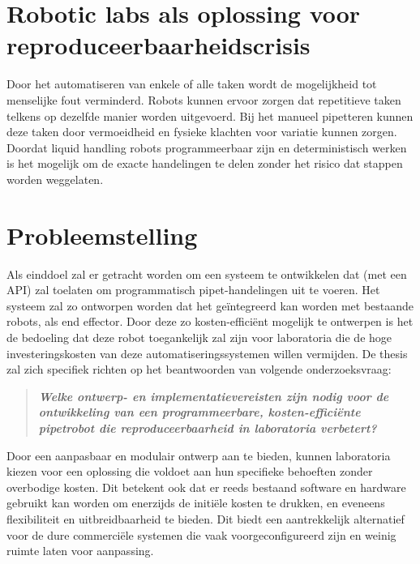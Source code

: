 \section{Robotic labs als oplossing voor reproduceerbaarheidscrisis}
Door het automatiseren van enkele of alle taken wordt de mogelijkheid tot menselijke fout verminderd. Robots kunnen ervoor zorgen dat repetitieve taken telkens op dezelfde manier worden uitgevoerd. Bij het manueel pipetteren kunnen deze taken door vermoeidheid en fysieke klachten voor variatie kunnen zorgen.\ \cite{RN9} Doordat liquid handling robots programmeerbaar zijn en deterministisch werken is het mogelijk om de exacte handelingen te delen zonder het risico dat stappen worden weggelaten.

\section{Probleemstelling}
Als einddoel zal er getracht worden om een systeem te ontwikkelen dat (met een API) zal toelaten om programmatisch pipet-handelingen uit te voeren. Het systeem zal zo ontworpen worden dat het geïntegreerd kan worden met bestaande robots, als end effector. Door deze zo kosten-efficiënt mogelijk te ontwerpen is het de bedoeling dat deze robot toegankelijk zal zijn voor laboratoria die de hoge investeringskosten van deze automatiseringssystemen willen vermijden. De thesis zal zich specifiek richten op het beantwoorden van volgende onderzoeksvraag:\begin{quote}
    \begin{center}
        \textbf{\textit{Welke ontwerp- en implementatievereisten zijn nodig voor de ontwikkeling van een programmeerbare, kosten-efficiënte pipetrobot die reproduceerbaarheid in laboratoria verbetert?}}
    \end{center}
\end{quote}
Door een aanpasbaar en modulair ontwerp aan te bieden, kunnen laboratoria kiezen voor een oplossing die voldoet aan hun specifieke behoeften zonder overbodige kosten. Dit betekent ook dat er reeds bestaand software en hardware gebruikt kan worden om enerzijds de initiële kosten te drukken, en eveneens flexibiliteit en uitbreidbaarheid te bieden. Dit biedt een aantrekkelijk alternatief voor de dure commerciële systemen die vaak voorgeconfigureerd zijn en weinig ruimte laten voor aanpassing.